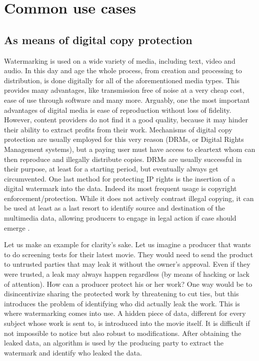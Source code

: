 \section{Common use cases}
\subsection{As means of digital copy protection}

Watermarking is used on a wide variety of media, including text, video and audio. In this day and age the whole process, from creation and processing to distribution, is done digitally for all of the aforementioned media types. This provides many advantages, like transmission free of noise at a very cheap cost, ease of use through software and many more. Arguably, one the most important advantages of digital media is ease of reproduction without loss of fidelity. However, content providers do not find it a good quality, because it may hinder their ability to extract profits from their work. Mechanisms of digital copy protection are usually employed for this very reason (DRMs, or Digital Rights Management systems), but a paying user must have access to cleartext whom can then reproduce and illegally distribute copies. DRMs are usually successful in their purpose, at least for a starting period, but eventually always get circumvented. One last method for protecting IP rights is the insertion of a digital watermark into the data. Indeed its most frequent usage is copyright enforcement/protection. While it does not actively contrast illegal copying, it can be used at least as a last resort to identify source and destination of the multimedia data, allowing producers to engage in legal action if case should emerge \cite[page 1, “Introduction”]{hartung}.




Let us make an example for clarity's sake.
Let us imagine a producer that wants to do screening tests for their latest movie. They would need to send the product to untrusted parties that may leak it without the owner's approval. Even if they were trusted, a leak may always happen regardless (by means of hacking or lack of attention). How can a producer protect his or her work? One way would be to disincentivize sharing the protected work by threatening to cut ties, but this introduces the problem of identifying who did actually leak the work. This is where watermarking comes into use. A hidden piece of data, different for every subject whose work is sent to, is introduced into the movie itself. It is difficult if not impossible to notice but also robust to modifications. After obtaining the leaked data, an algorithm is used by the producing party to extract the watermark and identify who leaked the data. 


